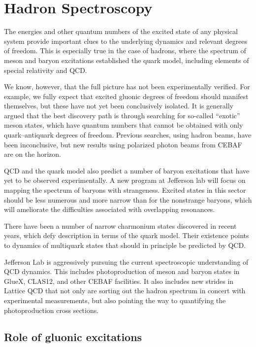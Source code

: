 \section{ Hadron Spectroscopy}

The energies and other quantum numbers of the excited state of any physical system provide important clues to the underlying dynamics and relevant degrees of freedom. This is especially true in the case of hadrons, where the spectrum of meson and baryon excitations established the quark model, including elements of special relativity and QCD.~\cite{Godfrey:1985xj,Capstick:1986ter}

We know, however, that the full picture has not been experimentally verified. For example, we fully expect that excited gluonic degrees of freedom should manifest themselves, but these have not yet been conclusively isolated. It is generally argued that the best discovery path is through searching for so-called ``exotic'' meson states, which have quantum numbers that cannot be obtained with only quark--antiquark degrees of freedom. Previous searches, using hadron beams, have been inconclusive, but new results using polarized photon beams from CEBAF are on the horizon.

QCD and the quark model also predict a number of baryon excitations that have yet to be observed experimentally. A new program at Jefferson lab will focus on mapping the spectrum of baryons with strangeness. Excited states in this sector should be less numerous and more narrow than for the nonstrange baryons, which will ameliorate the difficulties associated with overlapping resonances.

There have been a number of narrow charmonium states discovered in recent years, which defy description in terms of the quark model. Their existence points to dynamics of multiquark states that should in principle be predicted by QCD.

Jefferson Lab is aggressively pursuing the current spectroscopic understanding of QCD dynamics. This includes photoproduction of meson and baryon states in GlueX, CLAS12, and other CEBAF facilities. It also includes new strides in Lattice QCD that not only are sorting out the hadron spectrum in concert with experimental measurements, but also pointing the way to quantifying the photoproduction cross sections.

\subsection{Role of gluonic excitations} 
\label{sec:gluerole}

